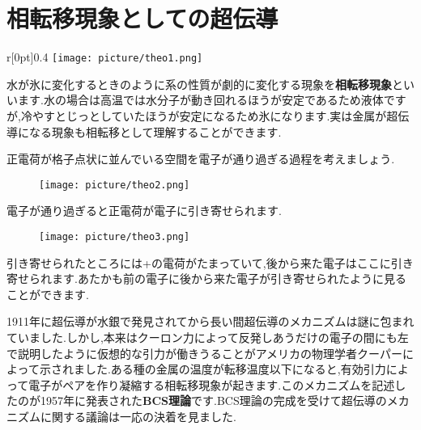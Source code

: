 \documentclass[12pt, a3j, dvipdfmx, jis2004]{jsarticle}
\begin{document}
\sffamily\gtfamily

\newpage
\section*{相転移現象としての超伝導}
\begin{tcbraster}[raster columns = 2, raster equal height = rows]
	\begin{tcolorbox}[title =相転移現象, raster multicolumn = 2]
		\begin{wrapfigure}{r}[0pt]{0.4\linewidth}
			\centering
			\vspace{-1zh}
			\texttt{[image: picture/theo1.png]}
			\end{wrapfigure}
		水が氷に変化するときのように系の性質が劇的に変化する現象を\textbf{相転移現象}といいます.水の場合は高温では水分子が動き回れるほうが安定であるため液体ですが,冷やすとじっとしていたほうが安定になるため氷になります.実は金属が超伝導になる現象も相転移として理解することができます.
	\end{tcolorbox}
	\begin{tcolorbox}[title=電子-格子相互作用]
		正電荷が格子点状に並んでいる空間を電子が通り過ぎる過程を考えましょう.
		\begin{figure}[H]
			\centering
			\vspace{-1zh}
			\texttt{[image: picture/theo2.png]}
		\end{figure}
		\vspace{-1zh}電子が通り過ぎると正電荷が電子に引き寄せられます.
		\begin{figure}[H]
			\centering
			\vspace{-1zh}
			\texttt{[image: picture/theo3.png]}
		\end{figure}
		\vspace{-1zh}引き寄せられたところには+の電荷がたまっていて,後から来た電子はここに引き寄せられます.あたかも前の電子に後から来た電子が引き寄せられたように見ることができます.
	\end{tcolorbox}
	\begin{tcolorbox}[title = 超伝導のメカニズム]
	1911年に超伝導が水銀で発見されてから長い間超伝導のメカニズムは謎に包まれていました.しかし,本来はクーロン力によって反発しあうだけの電子の間にも左で説明したように仮想的な引力が働きうることがアメリカの物理学者クーパーによって示されました.ある種の金属の温度が転移温度以下になると,有効引力によって電子がペアを作り凝縮する相転移現象が起きます.このメカニズムを記述したのが1957年に発表された\textbf{BCS理論}です.BCS理論の完成を受けて超伝導のメカニズムに関する議論は一応の決着を見ました.

\end{tcolorbox}
\end{tcbraster}
\end{document}
